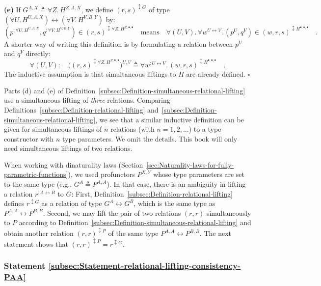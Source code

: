 \textbf{(e)} If $G^{A,X}\triangleq\forall Z.\,H^{Z,A,X}$, we define
$(r,s)^{\updownarrow G}$ of type $(\forall U.\,H^{U,A,X})\leftrightarrow(\forall V.\,H^{V,B,Y})$
by:
\[
(p^{:\forall U.\,H^{U,A,X}},q^{:\forall V.\,H^{V,B,Y}})\in(r,s)^{\updownarrow\forall Z.\,H^{Z,\bullet,\bullet}}\quad\text{means}\quad\forall(U,V).\,\forall w^{U\leftrightarrow V}.\,(p^{U},q^{V})\in(w,r,s)^{\updownarrow H^{\bullet,\bullet,\bullet}}\quad.
\]
A shorter way of writing this definition is by formulating a relation
between $p^{U}$ and $q^{V}$ directly:
\begin{equation}
\forall(U,V):\quad\big((r,s)^{\updownarrow\forall Z.\,H^{Z,\bullet,\bullet}}\big)^{U,V}\triangleq\forall w^{:U\leftrightarrow V}.\,(w,r,s)^{\updownarrow H^{\bullet,\bullet,\bullet}}\quad.\label{eq:relational-lifting-quantified-types-short-1}
\end{equation}
The inductive assumption is that simultaneous liftings to $H$ are
already defined. $\square$

Parts (d) and (e) of Definition~\ref{subsec:Definition-simultaneous-relational-lifting}
use a simultaneous lifting of \emph{three} relations. Comparing Definitions~\ref{subsec:Definition-relational-lifting}
and~\ref{subsec:Definition-simultaneous-relational-lifting}, we
see that a similar inductive definition can be given for simultaneous
liftings of $n$ relations (with $n=1,2,...$) to a type constructor
with $n$ type parameters. We omit the details. This book will only
need simultaneous liftings of two relations.

When working with dinaturality laws (Section~\ref{sec:Naturality-laws-for-fully-parametric-functions}),
we used profunctors $P^{X,Y}$ whose type parameters are set to the
same type (e.g., $G^{A}\triangleq P^{A,A}$). In that case, there
is an ambiguity in lifting a relation $r^{:A\leftrightarrow B}$ to
$G$: First, Definition~\ref{subsec:Definition-relational-lifting}
defines $r^{\updownarrow G}$ as a relation of type $G^{A}\leftrightarrow G^{B}$,
which is the same type as $P^{A,A}\leftrightarrow P^{B,B}$. Second,
we may lift the pair of two relations $\left(r,r\right)$ simultaneously
to $P$ according to Definition~\ref{subsec:Definition-simultaneous-relational-lifting}
and obtain another relation $\left(r,r\right)^{\updownarrow P}$ of
the same type $P^{A,A}\leftrightarrow P^{B,B}$. The next statement
shows that $(r,r)^{\updownarrow P}=r^{\updownarrow G}$.

\subsubsection{Statement \label{subsec:Statement-relational-lifting-consistency-PAA}\ref{subsec:Statement-relational-lifting-consistency-PAA}}

